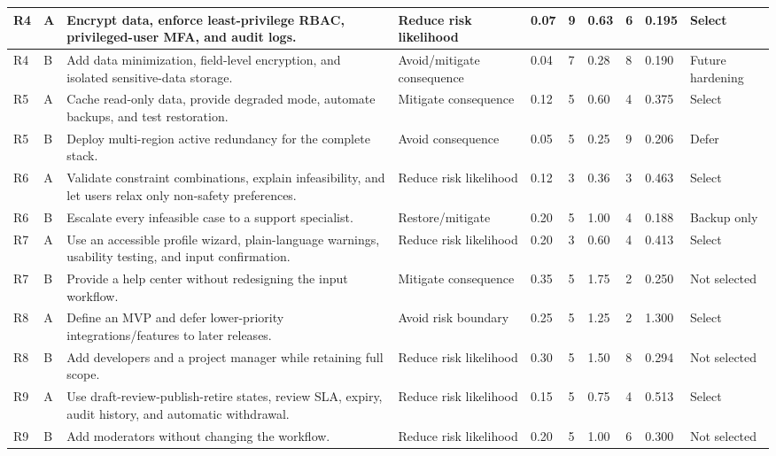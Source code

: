 \documentclass[11pt,a4paper]{article}
\begin{document}
\begin{landscape}
\begin{center}
\begin{longtable}{|p{0.7cm}|p{0.6cm}|p{6.0cm}|p{3.2cm}|p{1.1cm}|p{1.1cm}|p{1.3cm}|p{1.3cm}|p{1.1cm}|p{3.0cm}|}
R4 & A & Encrypt data, enforce least-privilege RBAC, privileged-user MFA, and audit logs. & Reduce risk likelihood & 0.07 & 9 & 0.63 & 6 & 0.195 & Select \\ \hline
R4 & B & Add data minimization, field-level encryption, and isolated sensitive-data storage. & Avoid/mitigate consequence & 0.04 & 7 & 0.28 & 8 & 0.190 & Future hardening \\ \hline
R5 & A & Cache read-only data, provide degraded mode, automate backups, and test restoration. & Mitigate consequence & 0.12 & 5 & 0.60 & 4 & 0.375 & Select \\ \hline
R5 & B & Deploy multi-region active redundancy for the complete stack. & Avoid consequence & 0.05 & 5 & 0.25 & 9 & 0.206 & Defer \\ \hline
R6 & A & Validate constraint combinations, explain infeasibility, and let users relax only non-safety preferences. & Reduce risk likelihood & 0.12 & 3 & 0.36 & 3 & 0.463 & Select \\ \hline
R6 & B & Escalate every infeasible case to a support specialist. & Restore/mitigate & 0.20 & 5 & 1.00 & 4 & 0.188 & Backup only \\ \hline
R7 & A & Use an accessible profile wizard, plain-language warnings, usability testing, and input confirmation. & Reduce risk likelihood & 0.20 & 3 & 0.60 & 4 & 0.413 & Select \\ \hline
R7 & B & Provide a help center without redesigning the input workflow. & Mitigate consequence & 0.35 & 5 & 1.75 & 2 & 0.250 & Not selected \\ \hline
R8 & A & Define an MVP and defer lower-priority integrations/features to later releases. & Avoid risk boundary & 0.25 & 5 & 1.25 & 2 & 1.300 & Select \\ \hline
R8 & B & Add developers and a project manager while retaining full scope. & Reduce risk likelihood & 0.30 & 5 & 1.50 & 8 & 0.294 & Not selected \\ \hline
R9 & A & Use draft-review-publish-retire states, review SLA, expiry, audit history, and automatic withdrawal. & Reduce risk likelihood & 0.15 & 5 & 0.75 & 4 & 0.513 & Select \\ \hline
R9 & B & Add moderators without changing the workflow. & Reduce risk likelihood & 0.20 & 5 & 1.00 & 6 & 0.300 & Not selected \\ \hline
\end{longtable}
\end{center}
\end{landscape}
\end{document}
